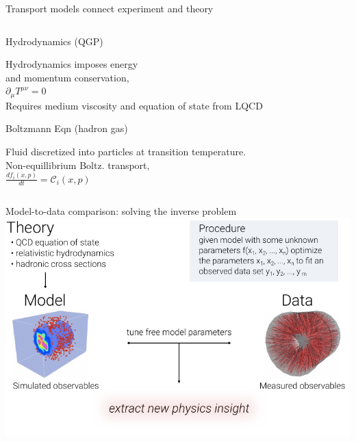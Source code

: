 \documentclass[xcolor=dvipsnames, aspectratio=169]{beamer}
\begin{document}
\begin{frame}[plain]{Transport models connect experiment and theory}
\begin{columns}[T]
\begin{column}{0.5\textwidth}
            \begin{block}{\strut \small Hydrodynamics (QGP)}
                \footnotesize
                \textcolor{almostblack}{
                Hydrodynamics imposes energy\\and momentum conservation,\\[1ex] 
                \quad $\displaystyle \partial_\mu T^{\mu \nu} = 0$\\[1ex]
                Requires medium viscosity and equation of state from LQCD}
            \end{block}

            \begin{block}{\strut \small Boltzmann Eqn (hadron gas)}
                \footnotesize
                \textcolor{almostblack}{
                Fluid discretized into particles at transition temperature.\\[1ex]
                Non-equillibrium Boltz. transport,\\[1ex]
                \quad $\displaystyle \frac{df_i(x,p)}{dt} = \mathcal{C}_i(x,p)$}
            \end{block}
        \end{column}
        
        \begin{column}{0.05\textwidth}
        \end{column}
    \end{columns}
\end{frame}


\begin{frame}[t]{Model-to-data comparison: solving the inverse problem}
    \centering \bigskip
    \includegraphics[height=0.85\textheight]{model2data}
\end{frame}
\end{document}
